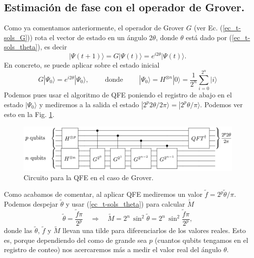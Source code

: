 \documentclass[a4paper,11pt]{article} %
\numberwithin{equation}{section}
\def\rqa{\quad \Rightarrow \quad}
\begin{document}
\subsection{Estimación de fase con el operador de Grover.}

Como ya comentamos anteriormente, el operador de Grover $G$ (ver Ec. (\ref{ec_t-sols_G})) rota el vector de estado en un ángulo $2\theta$, donde $\theta$ está dado por (\ref{ec_t-sols_theta}), es decir
\begin{equation}
|\Psi(t+1) \rangle = G | \Psi(t) \rangle = e^{i 2 \theta} | \Psi(t) \rangle.
\end{equation}
En concreto, se puede aplicar sobre el estado inicial
\begin{equation}
\boxed{G | \Psi_0 \rangle = e^{i 2 \theta} | \Psi_0 \rangle}, 
\qquad \text{ donde } \qquad
| \Psi_0 \rangle = H^{\otimes n} |0\rangle = \frac{1}{2^n}  \sum_{i=0}^{2^n} | i \rangle
\end{equation}
Podemos pues usar el algoritmo de QFE poniendo el registro de abajo en el estado $| \Psi_0 \rangle $ y mediremos a la salida el estado $| 2^p 2 \theta / 2 \pi \rangle = | 2^p \theta / \pi \rangle$. Podemos ver esto en la Fig. \ref{Fig_QC_QPE_G}.

	\begin{figure}[h]
	\centering 
	\includegraphics[width=0.9\linewidth]{Figuras/Fig_QC_QPE_G.png}
	\caption{Circuito para la QFE en el caso de Grover.}
	\label{Fig_QC_QPE_G}
	\end{figure}

Como acabamos de comentar, al aplicar QFE mediremos un valor $\tilde{f} = 2^p\tilde{\theta} / \pi$. Podemos despejar $\tilde{\theta}$ y usar (\ref{ec_t-sols_theta}) para calcular $\tilde{M}$
\begin{equation} \label{ec_QC_medidas}
\tilde{\theta} = \frac{\tilde{f} \pi}{2^p} \rqa \tilde{M} = 2^n \, \sin^2 \tilde{\theta} = 2^n \, \sin^2 \frac{\tilde{f} \pi}{2^p},
\end{equation}
donde las $\tilde{\theta}$, $\tilde{f}$ y $\tilde{M}$ llevan una tilde para diferenciarlos de los valores reales. Esto es, porque dependiendo del como de grande sea $p$ (cuantos qubits tengamos en el registro de conteo) nos acercaremos más a medir el valor real del ángulo $\theta$. 
\end{document}
